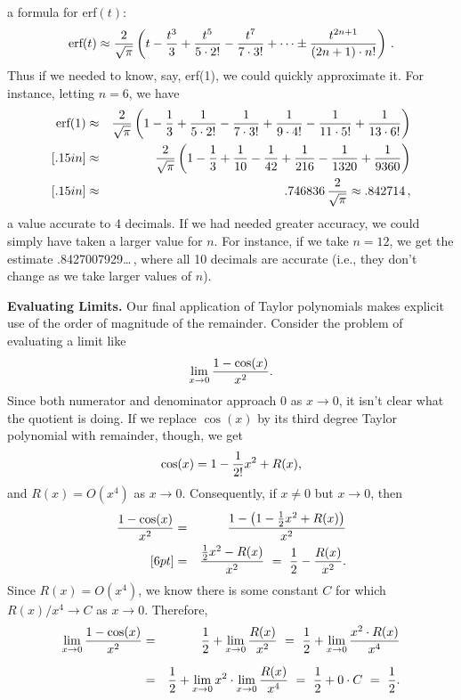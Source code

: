 {{{{        
a formula for erf$(t)$:
        \[
\mbox{erf$(t)$} \approx {2 \over \sqrt{\pi}} \left(t - {t^3\over 3} + {t^5\over 5 \cdot 2!} -
{t^7 \over 7 \cdot 3!} + \cdots \pm {t^{2n+1} \over (2n+1) \cdot n!}\right)\, .
\]
Thus if we needed to know, say, erf(1), we could quickly approximate it.  For instance, letting $n=6$, we have
\begin{eqnarray*}
\mbox{erf$(1)$}& \approx &{2 \over \sqrt{\pi}} \left(1-{1\over 3} + {1\over 5 \cdot 2!} -
        {1\over 7 \cdot 3!} + {1\over 9 \cdot 4!} - {1\over 11 \cdot 5!} + {1\over 13 \cdot 6!}\right)\\ [.15in]
        &\approx&{2 \over \sqrt{\pi}} \left(1-{1 \over 3}+{1 \over 10}-{1 \over 42}+{1 \over 216}-{1 \over 1320}+{1 \over 9360}\right) \\ [.15in]
        &\approx&.746836\,{2 \over \sqrt{\pi}} \approx .842714\, ,
\end{eqnarray*}
a value accurate to 4 decimals.  If we had needed greater accuracy, we could simply have taken a larger value for $n$.  For instance, if we take $n=12$, we get the estimate .8427007929\ldots \,, where all 10 decimals are accurate (i.e., they don't change as we take larger values of $n$).

\vspace*{14pt}



{\bf Evaluating Limits.}  Our final application of Taylor polynomials makes explicit use of the order of magnitude of the remainder.  Consider the problem of evaluating a limit like
        \[
\lim_{x \to 0} {1 - \cos(x) \over x^2}.
\]
Since both numerator and denominator approach $0$ as $x \to 0$, it isn't clear what  the quotient is doing.  If we replace $\cos(x)$ by its third degree Taylor polynomial with remainder, though, we get
        \[
\cos(x) = 1 - {1 \over 2!} x^2 + R(x),
\]
and $R(x) = O(x^4)$ as $x \to 0$.  Consequently, if $x \neq 0$ but $x \to 0$, then
        \begin{eqnarray*}
        {1 - \cos(x) \over x^2} & = &
                {1-\left(1-{1 \over 2}x^2 + R(x)\right) \over x^2}\\ [6pt]
        &=&{{1 \over 2}x^2 - R(x) \over x^2} \ = \ 
                \frac{1}{2} - {R(x) \over x^2}.
        \end{eqnarray*}
Since $R(x) = O(x^4)$, we know there is some constant $C$ for which $R(x)/x^4 \to C$ as $x \to 0$.  Therefore,
        \begin{eqnarray*}
        \lim_{x \to 0}{1 - \cos(x) \over x^2} & = &
                \frac{1}{2} + \lim_{x \to 0}{R(x) \over x^2} \ = \
                \frac{1}{2} + \lim_{x \to 0}{x^2 \cdot R(x) \over x^4} \\[6pt]
        &=& \frac{1}{2} + 
                \lim_{x \to 0} x^2 \cdot \lim_{x \to 0}{R(x) \over x^4} \ = \
        \frac{1}{2} +  0 \cdot C \ = \ \frac{1}{2}.
        \end{eqnarray*}

}}}}
